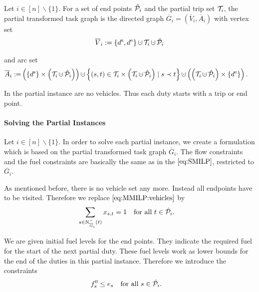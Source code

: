 \begin{definition}

Let ${i\in[n]\backslash\{1\}}$. For a set of end points $\hat{\mathcal{P}}_i$ and the partial trip set $\mathcal{T}_i$, the partial transformed task graph is the directed graph ${\overline{G}_i=\left(\overline{V}_i,\overline{A}_i\right)}$ with vertex set
\begin{align*}
	\overline{V}_i := \left\{\ds,\de\right\}\cupdot\Ti\cupdot\Phat_i
\end{align*}

and arc set
\begin{align*}
	\overline{A}_i := & \left(\left\{\ds\right\}\times\left(\Ti\cupdot\Phat_i\right)\right)\cupdot\left\{(s,t)\in\Ti\times\left(\Ti\cupdot\Phat_i\right)\mid s\prec t\right\} \cupdot\left(\left(\Ti\cupdot\Phat_i\right)\times\left\{\de\right\}\right).
\end{align*}

\end{definition}

In the partial instance are no vehicles. Thus each duty starts with a trip or end point.

\paragraph{Solving the Partial Instances} \parfill

Let ${i\in[n]\backslash\{1\}}$. In order to solve each partial instance, we create a formulation which is based on the partial transformed task graph $\overline{G}_i$. The flow constraints and the fuel constraints are basically the same as in the $\eqref{eq:SMILP}$, restricted to $\overline{G}_i$. 

As mentioned before, there is no vehicle set any more. Instead all endpoints have to be visited. Therefore we replace $\eqref{eq:MMILP:vehicles}$ by
\begin{align}
	& \sum_{s\in\operatorname{N}_{\overline{G}_i}^-(t)} x_{s,t} = 1 && \text{for all } t\in\hat{\mathcal{P}}_i. \label{eq:CMILP:start_end_points}
\end{align}

We are given initial fuel levels for the end points. They indicate the required fuel for the start of the next partial duty. These fuel levels work as lower bounds for the end of the duties in this partial instance. Therefore we introduce the constraints
\begin{align}
	& f^0_s \leq e_s && \text{for all } s\in\hat{\mathcal{P}}_i.\label{eq:CMILP:final_fuel}
\end{align}

